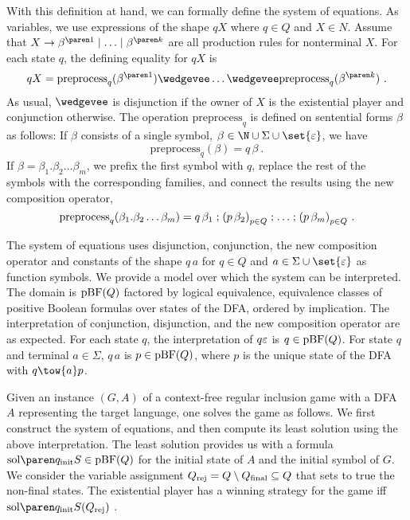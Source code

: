 \documentclass[../../diss.tex]{subfiles}
\begin{document}
With this definition at hand, we can formally define the system of equations.
As variables, we use expressions of the shape $qX$ where $q \in Q$ and $X \in N$.
Assume that $X \to \itr{\beta}{1} \mid \ldots \mid \itr{\beta}{k}$ are all production rules for nonterminal $X$.
For each state $q$, the defining equality for $qX$ is
\[
    qX = \text{preprocess}_q(\itr{\beta}{1}) \wedgevee \ldots \wedgevee \text{preprocess}_q(\itr{\beta}{k})
    \ .
\]
As usual, $\wedgevee$ is disjunction if the owner of $X$ is the existential player and conjunction otherwise.
The operation $\text{preprocess}_q$ is defined on sentential forms $\beta$ as follows:
If $\beta$ consists of a single symbol, $\beta \in \N \cup \Sigma \cup \set{\eps}$, we have
\[
    \text{preprocess}_q(\beta) = q\,\beta
    \ .
\]
If $\beta = \beta_1.\beta_2 \ldots \beta_m$, we prefix the first symbol with $q$, replace the rest of the symbols with the corresponding families, and connect the results using the new composition operator,
\[
    \text{preprocess}_q(\beta_1.\beta_2 \ldots \beta_m) = q\,\beta_1 \mathrel{;} {(p \, \beta_2)}_{p \in Q} \mathrel{;} \ldots \mathrel{;} {(p \, \beta_m)}_{p \in Q}
    \ .
\]

The system of equations uses disjunction, conjunction, the new composition operator and constants of the shape $q \, a$ for $q \in Q$ and $a \in \Sigma \cup \set{\eps}$ as function symbols.
We provide a model over which the system can be interpreted.
The domain is $\text{pBF}(Q)$ factored by logical equivalence, \ie equivalence classes of positive Boolean formulas over states of the DFA, ordered by implication.
The interpretation of conjunction, disjunction, and the new composition operator are as expected.
For each state $q$, the interpretation of $q \varepsilon$ is $q \in \text{pBF}(Q)$.
For state $q$ and terminal $a \in \Sigma$, $q \,  a$ is $p \in \text{pBF}(Q)$, where $p$ is the unique state of the DFA with $q \tow{a} p$.

Given an instance $(G,A)$ of a context-free regular inclusion game with a DFA $A$ representing the target language, one solves the game as follows.
We first construct the system of equations, and then compute its least solution using the above interpretation.
The least solution provides us with a formula $\sol{ \qinit S} \in \pBF(Q)$ for the initial state of $A$ and the initial symbol of $G$.
We consider the variable assignment $Q_{\text{rej}} = Q \setminus Q_{\text{final}} \subseteq Q$ that sets to true the non-final states.
The existential player has a winning strategy for the game iff $\sol{ \qinit S}(Q_{\text{rej}})$ .
\end{document}
